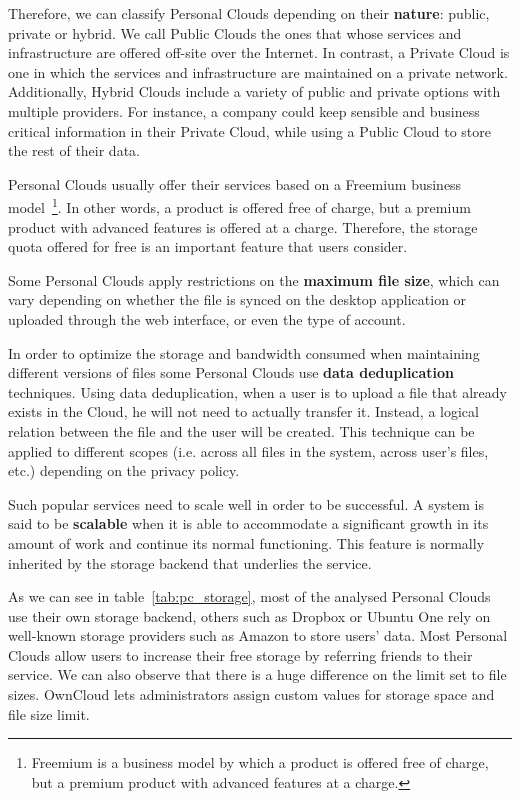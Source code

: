 Therefore, we can classify Personal Clouds depending on their \textbf{nature}: public, private or hybrid. We call Public Clouds the ones that whose services and infrastructure are offered off-site over the Internet. In contrast, a Private Cloud is one in which the services and infrastructure are maintained on a private network. Additionally, Hybrid Clouds include a variety of public and private options with multiple providers. For instance, a company could keep sensible and business critical information in their Private Cloud, while using a Public Cloud to store the rest of their data.

Personal Clouds usually offer their services based on a Freemium business model~\footnote{Freemium is a business model by which a product is offered free of charge, but a premium product with advanced features at a charge.}. In other words, a product is offered free of charge, but a premium product with advanced features is offered at a charge. Therefore, the storage quota offered for free is an important feature that users consider.

Some Personal Clouds apply restrictions on the \textbf{maximum file size}, which can vary depending on whether the file is synced on the desktop application or uploaded through the web interface, or even the type of account.

In order to optimize the storage and bandwidth consumed when maintaining different versions of files some Personal Clouds use \textbf{data deduplication} techniques. Using data deduplication, when a user is to upload a file that already exists in the Cloud, he will not need to actually transfer it. Instead, a logical relation between the file and the user will be created. This technique can be applied to different scopes (i.e. across all files in the system, across user's files, etc.) depending on the privacy policy.

Such popular services need to scale well in order to be successful. A system is said to be \textbf{scalable} when it is able to accommodate a significant growth in its amount of work and continue its normal functioning. This feature is normally inherited by the storage backend that underlies the service.

As we can see in table~\ref{tab:pc_storage}, most of the analysed Personal Clouds use their own storage backend, others such as Dropbox or Ubuntu One rely on well-known storage providers such as Amazon to store users' data. Most Personal Clouds allow users to increase their free storage by referring friends to their service. We can also observe that there is a huge difference on the limit set to file sizes. OwnCloud lets administrators assign custom values for storage space and file size limit.


